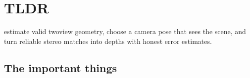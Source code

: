 \documentclass[letterpaper,11pt,english,openany,oneside]{jupyterBook}
\begin{document}
\sphinxstepscope

\clearpage


\section{TLDR}
\label{\detokenize{lectures/lecture04/tldr:tldr}}\label{\detokenize{lectures/lecture04/tldr:lec04-tldr}}\label{\detokenize{lectures/lecture04/tldr::doc}}
\sphinxAtStartPar
{} estimate valid two\sphinxhyphen{}view geometry, choose a camera pose that sees the scene, and turn reliable stereo matches into depths with honest error estimates.


\subsection{The important things}
\end{document}
